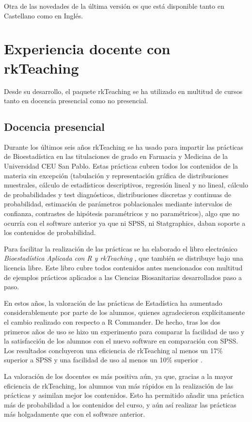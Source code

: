 \documentclass[a4paper,10pt,twoside]{article}
\newcommand{\rkteaching}{\textsf{rkTeaching}}
\newcommand{\spss}{\textsf{SPSS}}
\newcommand{\statgraphics}{\textsf{Statgraphics}}
\newcommand{\rcommander}{\textsf{R Commander}}
\begin{document}
Otra de las novedades de la última versión es que está disponible tanto en Castellano como en Inglés. 

\section{Experiencia docente con \rkteaching}
\label{s:docencia}
Desde su desarrollo, el paquete \rkteaching{} se ha utilizado en multitud de cursos tanto en docencia presencial como no
presencial. 

\subsection{Docencia presencial}
Durante los últimos seis años \rkteaching{} se ha usado para impartir las prácticas de Bioestadística en las
titulaciones de grado en Farmacia y Medicina de la Universidad CEU San Pablo.
Estas prácticas cubren todos los contenidos de la materia sin excepción (tabulación y representación gráfica de
distribuciones muestrales, cálculo de estadísticos descriptivos, regresión lineal y no lineal, cálculo de probabilidades
y test diagnósticos, distribuciones discretas y continuas de probabilidad, estimación de parámetros poblacionales
mediante intervalos de confianza, contrastes de hipótesis paramétricos y no paramétricos), algo que no ocurría con el
software anterior ya que ni \spss{}, ni \statgraphics{}, daban soporte a los contenidos de probabilidad.

Para facilitar la realización de las prácticas se ha elaborado el libro electrónico \emph{Bioestadística Aplicada
con R y rkTeaching} \cite{sanchez2014bioestadistica}, que también se distribuye bajo una licencia libre. 
Este libro cubre todos contenidos antes mencionados con multitud de ejemplos prácticos aplicados a las Ciencias
Biosanitarias desarrollados paso a paso.

En estos años, la valoración de las prácticas de Estadística ha aumentado considerablemente por parte de los alumnos,
quienes agradecieron explícitamente el cambio realizado con respecto a \rcommander{}. 
De hecho, tras los dos primeros años de uso se hizo un experimento para comparar la facilidad de uso y la satisfacción
de los alumnos con el nuevo software en comparación con \spss{}.
Los resultados concluyeron una eficiencia de \rkteaching{} al menos un 17\% superior a \spss{} y una facilidad de uso al
menos un 10\% superior \cite{sanchez2011rkteaching}.

La valoración de los docentes es más positiva aún, ya que, gracias a la mayor eficiencia de \rkteaching{}, los
alumnos van más rápidos en la realización de las prácticas y asimilan mejor los contenidos. 
Esto ha permitido añadir una práctica más de probabilidad a los contenidos del curso, y aún así realizar las prácticas
más holgadamente que con el software anterior.
\end{document}
